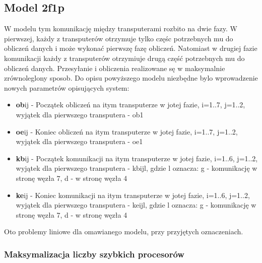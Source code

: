 \documentclass[a4paper,11pt, titlepage]{article}
\begin{document}
\subsection{Model 2f1p}
W modelu tym komunikację między transputerami rozbito na dwie fazy. W pierwszej, każdy z transputerów otrzymuje tylko częśc potrzebnych mu do obliczeń danych i może wykonać pierwszę fazę obliczeń. Natomiast w drugiej fazie komunikacji każdy z transputerów otrzymiuje drugą część potrzebnych mu do obliczeń danych. Przesyłanie i obliczenia realizowane sę w maksymalnie zrównoleglony sposob. 
Do opisu powyższego modelu niezbędne bylo wprowadzenie nowych parametrów opisujących system:
\begin{itemize}
\item \textbf{ob}ij - Początek obliczeń na itym transputerze w jotej fazie, i=1..7, j=1..2, wyjątek dla pierwszego transputera - ob1
\item \textbf{oe}ij - Koniec obliczeń na itym transputerze w jotej fazie, i=1..7, j=1..2, wyjątek dla pierwszego transputera - oe1
\item \textbf{kb}ij - Początek komunikacji na itym transputerze w jotej fazie, i=1..6, j=1..2, wyjątek dla pierwszego transputera - kbijl, gdzie l oznacza: g - komunikację w stronę węzła 7, d - w stronę węzła 4
\item \textbf{ke}ij - Koniec komunikacji na itym transputerze w jotej fazie, i=1..6, j=1..2, wyjątek dla pierwszego transputera - keijl, gdzie l oznacza: g - komunikację w stronę węzła 7, d - w stronę węzła 4 
\end{itemize}
Oto problemy liniowe dla omawianego modelu, przy przyjętych oznaczeniach.
\subsubsection{Maksymalizacja liczby szybkich procesorów}
\end{document}
